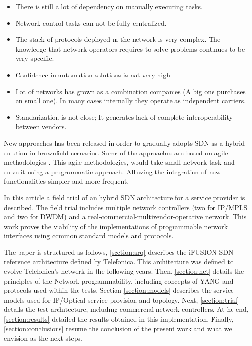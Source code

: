 \documentclass[a4paper,fleqn]{cas-dc}
\begin{document}
\begin{itemize}
    \item There is still a lot of dependency on manually executing tasks.
    \item Network control tasks can not be fully centralized.
    \item The stack of protocols deployed in the network is very complex.  The knowledge that network operators requires to solve problems continues to be very specific.
    \item Confidence in automation solutions is not very high.
    \item Lot of networks has grown as a combination companies (A big one purchases an small one). In many cases internally they operate as independent carriers. \item Standarization is not close; It generates lack of complete interoperability between vendors.
\end{itemize}

New approaches has been released in order to gradually adopts SDN as a hybrid solution in brownfield scenarios. Some of the approaches are based on agile methodologies \cite{devlic2012use,choi2018agile}. 
This agile methodologies, would take small network task and solve it using a programmatic approach. Allowing the integration of new functionalities simpler and more frequent.

In this article a field trial of an hybrid SDN architecture for a service provider is described. The field trial includes multiple network controllers (two for IP/MPLS and two for DWDM) and a real-commercial-multivendor-operative network. This work proves the viability of the implementations of programmable network interfaces using common standard models and protocols.

The paper is structured as follows, \cref{section:arq} describes the i\uppercase{FUSION} SDN reference architecture defined by Telefonica. This architecture was defined to evolve Telefonica's network in the following years. Then, \cref{section:net} details the principles of the Network programmability, including concepts of YANG and protocols used within the tests. Section \cref{section:models} describes the service models used for IP/Optical service provision and topology. Next, \cref{section:trial} details the test architecture, including commercial network controllers. At he end, \cref{section:results} detailed the results obtained in this implementation. Finally,  \cref{section:conclusions} resume the conclusion of the present work and what we envision as the next steps.    
\end{document}
